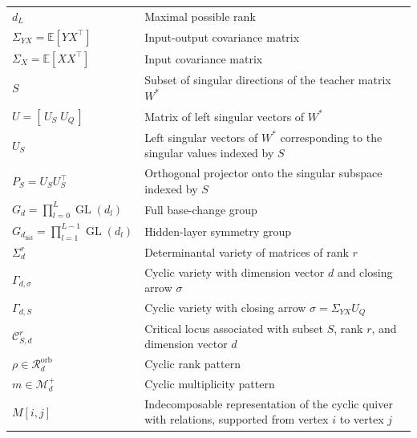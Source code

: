 \documentclass{article}
\newcommand{\GL}{\operatorname{GL}}
\theoremstyle{definition}
\begin{document}
\begin{center}
\begin{tabular}{p{} p{}}
$d_L$ & Maximal possible rank \\

$\Sigma_{YX}=\mathbb{E}[YX^\top]$ & Input-output covariance matrix \\

$\Sigma_X=\mathbb{E}[XX^\top]$ & Input covariance matrix \\

$S$ & Subset of singular directions of the teacher matrix $W^\ast$ \\

$U=[\,U_S\;U_Q\,]$ & Matrix of left singular vectors of $W^\ast$ \\

$U_S$ & Left singular vectors of $W^\ast$ corresponding to the singular values indexed by $S$ \\

$P_S=U_SU_S^\top$ & Orthogonal projector onto the singular subspace indexed by $S$ \\

$G_d=\prod_{l=0}^L \GL(d_l)$ & Full base-change group \\

$G_{d_{\mathrm{hid}}}=\prod_{l=1}^{L-1}\GL(d_l)$ & Hidden-layer symmetry group \\

$\Sigma_d^r$ & Determinantal variety of matrices of rank $r$ \\

$\Gamma_{d,\sigma}$ & Cyclic variety with dimension vector $d$ and closing arrow $\sigma$ \\

$\Gamma_{d,S}$ & Cyclic variety with closing arrow $\sigma=\Sigma_{YX}U_Q$ \\

$\mathcal{C}_{S,d}^r$ & Critical locus associated with subset $S$, rank $r$, and dimension vector $d$ \\

$\rho\in\mathcal{R}_d^{\mathrm{orb}}$ & Cyclic rank pattern \\

$m\in\mathcal{M}_d^{+}$ & Cyclic multiplicity pattern \\

$M[i,j]$ & Indecomposable representation of the cyclic quiver with relations, supported from vertex $i$ to vertex $j$ \\
\bottomrule
\end{tabular}
\end{center}
\end{document}

